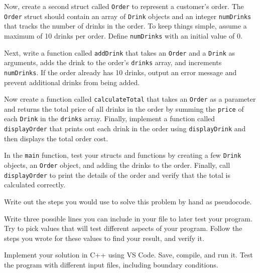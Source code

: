Now, create a second struct called \texttt{Order} to represent a customer’s order. The \texttt{Order} struct should contain an array of \texttt{Drink} objects and an integer \texttt{numDrinks} that tracks the number of drinks in the order. To keep things simple, assume a maximum of 10 drinks per order. Define \texttt{numDrinks} with an initial value of 0.

Next, write a function called \texttt{addDrink} that takes an \texttt{Order} and a \texttt{Drink} as arguments, adds the drink to the order’s \texttt{drinks} array, and increments \texttt{numDrinks}. If the order already has 10 drinks, output an error message and prevent additional drinks from being added.

Now create a function called \texttt{calculateTotal} that takes an \texttt{Order} as a parameter and returns the total price of all drinks in the order by summing the \texttt{price} of each \texttt{Drink} in the \texttt{drinks} array. Finally, implement a function called \texttt{displayOrder} that prints out each drink in the order using \texttt{displayDrink} and then displays the total order cost.

In the \texttt{main} function, test your structs and functions by creating a few \texttt{Drink} objects, an \texttt{Order} object, and adding the drinks to the order. Finally, call \texttt{displayOrder} to print the details of the order and verify that the total is calculated correctly.

\begin{multipart}
    Write out the steps you would use to solve this problem by hand as pseudocode.
\end{multipart}

\vspace{8cm}

\begin{multipart}
    Write three possible lines you can include in your file to later test your program. Try to pick values that will test different aspects of your program. Follow the steps you wrote for these values to find your result, and verify it.
\end{multipart}

\vspace{5cm}

\begin{multipart}
    Implement your solution in C++ using VS Code. Save, compile, and run it. Test the program with different input files, including boundary conditions.
\end{multipart}

